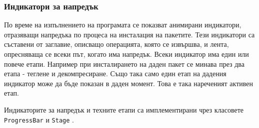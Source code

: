 \subsubsection{Индикатори за напредък}

По време на изпълнението на програмата се показват анимирани индикатори,
отразяващи напредъка по процеса на инсталация на пакетите. Тези индикатори са
съставени от заглавие, описващо операцията, която се извършва, и лента,
опресняваща се всеки път, когато има напредък. Всеки индикатор има един или
повече етапи. Например при инсталирането на даден пакет се минава през два
етапа - теглене и декомпресиране. Също така само един етап на дадения индикатор
може да бъде показан в даден момент. Това е така нареченият активен етап.

Индикаторите за напредък и техните етапи са имплементирани чрез класовете
\texttt{ProgressBar} и \texttt{Stage} .

